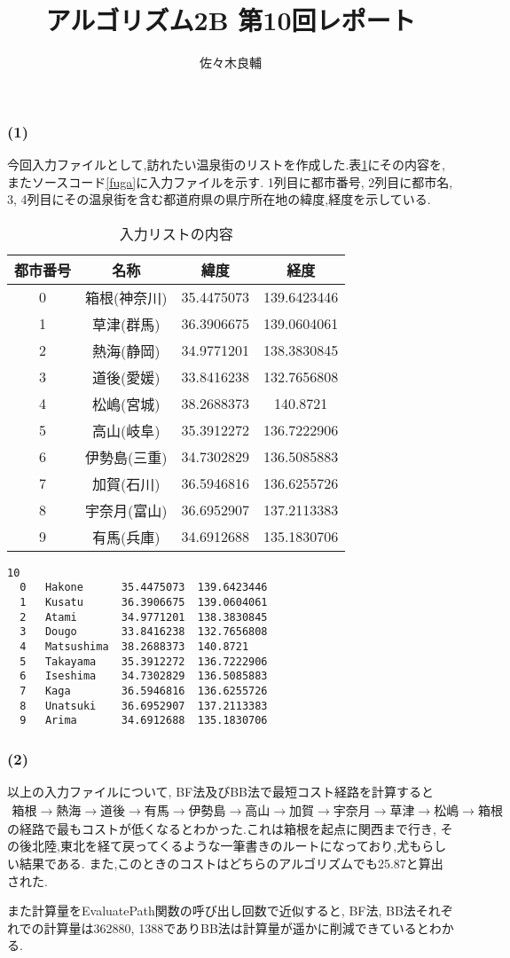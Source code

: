 \documentclass[uplatex,a4j,11pt,dvipdfmx]{jsarticle}
\begin{document}
\title{アルゴリズム2B 第10回レポート}
\author{佐々木良輔}
\date{}
\maketitle
\subsubsection*{(1)}
今回入力ファイルとして,訪れたい温泉街のリストを作成した.表\ref{tab:nyuuryoku}にその内容を,またソースコード\ref{fuga}に入力ファイルを示す.
1列目に都市番号,
2列目に都市名,
3, 4列目にその温泉街を含む都道府県の県庁所在地の緯度,経度を示している.
\begin{table}[h]
\caption{入力リストの内容}
\label{tab:nyuuryoku}
\centering
\begin{tabular}{c|ccc}
\hline
都市番号&名称&緯度&経度\\
\hline \hline
0&箱根(神奈川)&35.4475073&139.6423446\\
1&草津(群馬)&36.3906675&139.0604061\\
2&熱海(静岡)&34.9771201&138.3830845\\
3&道後(愛媛)&33.8416238&132.7656808\\
4&松嶋(宮城)&38.2688373&140.8721\\
5&高山(岐阜)&35.3912272&136.7222906\\
6&伊勢島(三重)&34.7302829&136.5085883\\
7&加賀(石川)&36.5946816&136.6255726\\
8&宇奈月(富山)&36.6952907&137.2113383\\
9&有馬(兵庫)&34.6912688&135.1830706\\
\hline
\end{tabular}
\end{table}
\clearpage
\begin{lstlisting}[caption=input file,label=fuga]
  10
  0   Hakone      35.4475073  139.6423446
  1   Kusatu      36.3906675  139.0604061
  2   Atami       34.9771201  138.3830845
  3   Dougo       33.8416238  132.7656808
  4   Matsushima  38.2688373  140.8721
  5   Takayama    35.3912272  136.7222906
  6   Iseshima    34.7302829  136.5085883
  7   Kaga        36.5946816  136.6255726
  8   Unatsuki    36.6952907  137.2113383
  9   Arima       34.6912688  135.1830706
\end{lstlisting}
\subsubsection*{(2)}
以上の入力ファイルについて,
BF法及びBB法で最短コスト経路を計算すると
\begin{align}
  箱根→熱海→道後→有馬→伊勢島→高山→加賀→宇奈月→草津→松嶋→箱根
\end{align}
の経路で最もコストが低くなるとわかった.これは箱根を起点に関西まで行き,
その後北陸,東北を経て戻ってくるような一筆書きのルートになっており,尤もらしい結果である.
また,このときのコストはどちらのアルゴリズムでも25.87と算出された.

また計算量をEvaluatePath関数の呼び出し回数で近似すると,
BF法, BB法それぞれでの計算量は362880, 1388でありBB法は計算量が遥かに削減できているとわかる.
\end{document}

